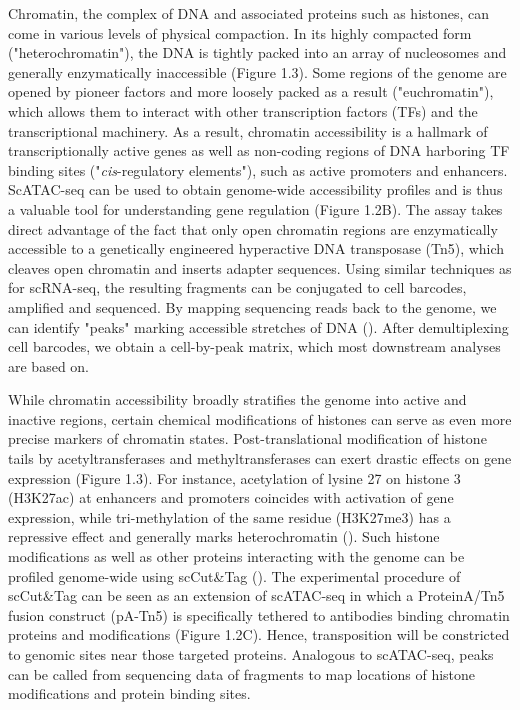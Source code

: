 Chromatin, the complex of DNA and associated proteins such as histones, can come in various levels of physical compaction. In its highly compacted form ("heterochromatin"), the DNA is tightly packed into an array of nucleosomes and generally enzymatically inaccessible (Figure 1.3). Some regions of the genome are opened by pioneer factors and more loosely packed as a result ("euchromatin"), which allows them to interact with other transcription factors (TFs) and the transcriptional machinery. As a result, chromatin accessibility is a hallmark of transcriptionally active genes as well as non-coding regions of DNA harboring TF binding sites ("\textit{cis}-regulatory elements"), such as active promoters and enhancers. ScATAC-seq can be used to obtain genome-wide accessibility profiles and is thus a valuable tool for understanding gene regulation (Figure 1.2B). The assay takes direct advantage of the fact that only open chromatin regions are enzymatically accessible to a genetically engineered hyperactive DNA transposase (Tn5), which cleaves open chromatin and inserts adapter sequences. Using similar techniques as for scRNA-seq, the resulting fragments can be conjugated to cell barcodes, amplified and sequenced. By mapping sequencing reads back to the genome, we can identify "peaks" marking accessible stretches of DNA (\cite{duan_model-based_2019}). After demultiplexing cell barcodes, we obtain a cell-by-peak matrix, which most downstream analyses are based on.

While chromatin accessibility broadly stratifies the genome into active and inactive regions, certain chemical modifications of histones can serve as even more precise markers of chromatin states. Post-translational modification of histone tails by acetyltransferases and methyltransferases can exert drastic effects on gene expression (Figure 1.3). For instance, acetylation of lysine 27 on histone 3 (H3K27ac) at enhancers and promoters coincides with activation of gene expression, while tri-methylation of the same residue (H3K27me3) has a repressive effect and generally marks heterochromatin (\cite{allis_molecular_2016}). Such histone modifications as well as other proteins interacting with the genome can be profiled genome-wide using scCut\&Tag (\cite{bartosovic_single-cell_2021,kaya-okur_cuttag_2019}). The experimental procedure of scCut\&Tag can be seen as an extension of scATAC-seq in which a ProteinA/Tn5 fusion construct (pA-Tn5) is specifically tethered to antibodies binding chromatin proteins and modifications (Figure 1.2C). Hence, transposition will be constricted to genomic sites near those targeted proteins. Analogous to scATAC-seq, peaks can be called from sequencing data of fragments to map locations of histone modifications and protein binding sites.

